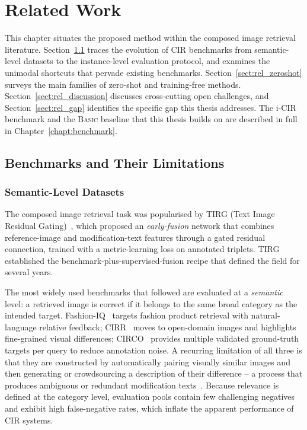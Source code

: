 \chapter{Related Work}\label{chapt:related}

This chapter situates the proposed method within the composed image retrieval
literature. Section~\ref{sect:rel_benchmarks} traces the evolution of CIR
benchmarks from semantic-level datasets to the instance-level evaluation
protocol, and examines the unimodal shortcuts that pervade existing benchmarks.
Section~\ref{sect:rel_zeroshot} surveys the main families of zero-shot
and training-free methods.
Section~\ref{sect:rel_discussion} discusses cross-cutting open challenges, and
Section~\ref{sect:rel_gap} identifies the specific gap this thesis addresses.
The i-CIR benchmark and the \textsc{Basic} baseline that this thesis builds on
are described in full in Chapter~\ref{chapt:benchmark}.

\section{Benchmarks and Their Limitations}\label{sect:rel_benchmarks}

\subsection{Semantic-Level Datasets}\label{sect:rel_semantic}

The composed image retrieval task was popularised by TIRG (Text Image Residual
Gating)~\cite{vo2019tirg}, which proposed an \emph{early-fusion} network that
combines reference-image and modification-text features through a gated residual
connection, trained with a metric-learning loss on annotated triplets. TIRG
established the benchmark-plus-supervised-fusion recipe that defined the field
for several years.

The most widely used benchmarks that followed are evaluated at a
\emph{semantic} level: a retrieved image is correct if it belongs to the same
broad category as the intended target.
Fashion-IQ~\cite{wu2021fashioniq} targets fashion product retrieval with
natural-language relative feedback; CIRR~\cite{liu2021cirr} moves to
open-domain images and highlights fine-grained visual differences;
CIRCO~\cite{baldrati2023circo} provides multiple validated ground-truth targets
per query to reduce annotation noise. A recurring limitation of all three is
that they are constructed by automatically pairing visually similar images and
then generating or crowdsourcing a description of their difference -- a process
that produces ambiguous or redundant modification texts~\cite{psomas2025icir}.
Because relevance is defined at the category level, evaluation pools contain few
challenging negatives and exhibit high false-negative rates, which inflate the
apparent performance of CIR systems.

